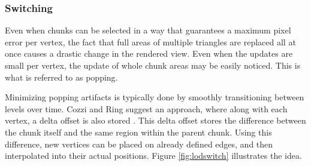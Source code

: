 \subsubsection{Switching}


Even when chunks can be selected in a way that guarantees a maximum pixel error per vertex, the fact that full areas of multiple triangles are replaced all at once causes a drastic change in the rendered view. Even when the updates are small per vertex, the update of whole chunk areas may be easily noticed. This is what is referred to as popping.

Minimizing popping artifacts is typically done by smoothly transitioning between levels over time. Cozzi and Ring suggest an approach, where along with each vertex, a delta offset is also stored \cite[p. 451]{cozzi11}. This delta offset stores the difference between the chunk itself and the same region within the parent chunk. Using this difference, new vertices can be placed on already defined edges, and then interpolated into their actual positions. Figure \ref{fig:lodswitch} illustrates the idea.

